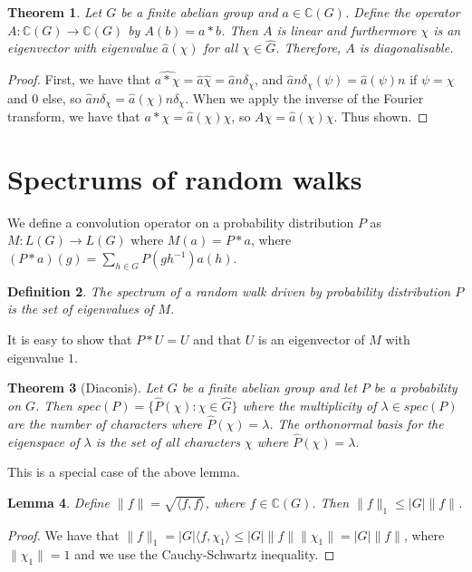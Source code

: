 \documentclass[]{article}
\newtheorem{theorem}{Theorem}
\newtheorem{lemma}[theorem]{Lemma}
\newtheorem{definition}[theorem]{Definition}
\theoremstyle{definition}
\numberwithin{theorem}{section}
\numberwithin{equation}{section}
\begin{document}
\begin{theorem}
	Let $G$ be a finite abelian group and $a \in \mathbb{C}(G)$. Define the operator $A: \mathbb{C}(G) \rightarrow \mathbb{C}(G)$ by $A(b) = a \ast b$. Then $A$ is linear and furthermore $\chi$ is an eigenvector with eigenvalue $\widehat{a}(\chi)$ for all $\chi \in \widehat{G}$. Therefore, $A$ is diagonalisable. 
\end{theorem}

\begin{proof}
	First, we have that $\widehat{a\ast \chi} = \widehat{a} \widehat{\chi} = \widehat{a} n \delta_\chi$, and $\widehat{a} n \delta_\chi(\psi) = \widehat{a}(\psi) n$ if $\psi = \chi$ and 0 else, so $\widehat{a} n \delta_\chi = \widehat{a}(\chi) n \delta_\chi$. When we apply the inverse of the Fourier transform, we have that $a \ast \chi = \widehat{a}(\chi) \chi$, so $A \chi = \widehat{a}(\chi) \chi$. Thus shown. 
\end{proof}

\section{Spectrums of random walks}
We define a convolution operator on a probability distribution $P$ as $M : L(G) \rightarrow L(G)$ where $M(a) = P \ast a$, where $(P \ast a) (g) =\sum_{h\in G} P(gh^{-1})a(h)$.
\begin{definition}
	The spectrum of a random walk driven by probability distribution $P$ is the set of eigenvalues of $M$. 
\end{definition} 
It is easy to show that $P \ast U = U$ and that $U$ is an eigenvector of $M$ with eigenvalue $1$. 


\begin{theorem}[Diaconis]
	Let $G$ be a finite abelian group and let $P$ be a probability on $G$. Then $spec(P) = \lbrace \widehat{P}(\chi) : \chi \in \widehat{G} \rbrace$ where the multiplicity of $\lambda \in spec(P)$ are the number of characters where $\widehat{P}(\chi) = \lambda$. The orthonormal basis for the eigenspace of $\lambda$ is the set of all characters $\chi$ where $\widehat{P}(\chi) = \lambda$. 
\end{theorem}
This is a special case of the above lemma. 

\begin{lemma}
	Define $\|f\| = \sqrt{\langle f, f \rangle}$, where $f \in \mathbb{C}(G)$. Then $\|f \|_1 \leq |G| \|f \|$.
\end{lemma}
\begin{proof}
	We have that $\|f \|_1 = |G| \langle f, \chi_1 \rangle \leq |G| \|f \| \|\chi_1 \| = |G| \|f \|$, where $\|\chi_1 \| = 1$ and we use the Cauchy-Schwartz inequality. 
\end{proof}
\end{document}
